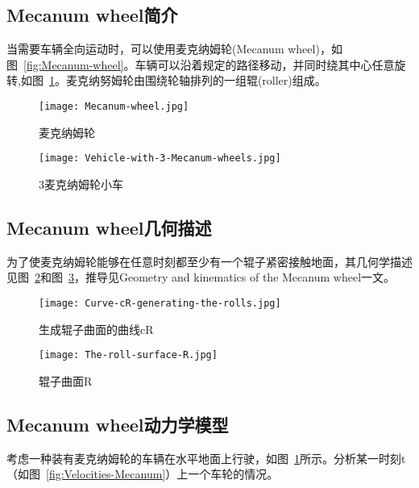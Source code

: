 \subsection{Mecanum wheel简介}
当需要车辆全向运动时，可以使用麦克纳姆轮(Mecanum wheel)，如图~\ref{fig:Mecanum-wheel}。车辆可以沿着规定的路径移动，并同时绕其中心任意旋转,如图~\ref{fig:Vehicle-with-3-Mecanum-wheels}。麦克纳努姆轮由围绕轮轴排列的一组辊(roller)组成。

\begin{figure}
    \begin{minipage}{0.48\textwidth}
      \centering
      \texttt{[image: Mecanum-wheel.jpg]}
      \caption{麦克纳姆轮}
      \label{fig:Mecanum-wheel}
    \end{minipage}\hfill
    \begin{minipage}{0.48\textwidth}
      \centering
      \texttt{[image: Vehicle-with-3-Mecanum-wheels.jpg]}
      \caption{3麦克纳姆轮小车}
      \label{fig:Vehicle-with-3-Mecanum-wheels}
    \end{minipage}
\end{figure}

\subsection{Mecanum wheel几何描述}
为了使麦克纳姆轮能够在任意时刻都至少有一个辊子紧密接触地面，其几何学描述见图~\ref{fig:Curve-cR-generating-the-rolls}和图~\ref{fig:The-roll-surface-R}，推导见Geometry and kinematics of the Mecanum wheel\cite{gfrerrer2008geometry}一文。

\begin{figure}[htbp]
    \centering
    \texttt{[image: Curve-cR-generating-the-rolls.jpg]}
    \caption{生成辊子曲面的曲线cR}
    \label{fig:Curve-cR-generating-the-rolls}
\end{figure}

\begin{figure}[htbp]
    \centering
    \texttt{[image: The-roll-surface-R.jpg]}
    \caption{辊子曲面R}
    \label{fig:The-roll-surface-R}
\end{figure}

\subsection{Mecanum wheel动力学模型}

考虑一种装有麦克纳姆轮的车辆在水平地面上行驶，如图~\ref{fig:Vehicle-with-3-Mecanum-wheels}所示。分析某一时刻t（如图~\ref{fig:Velocities-Mecanum}）上一个车轮的情况。

